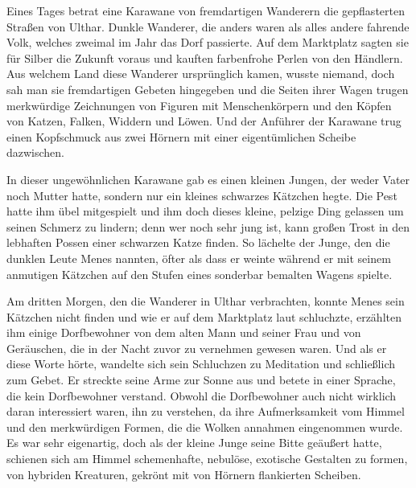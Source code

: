 \documentclass[a4paper]{memoir}
\begin{document}
Eines Tages betrat eine Karawane von fremdartigen Wanderern die gepflasterten Straßen von Ulthar. Dunkle Wanderer, die anders waren als alles andere fahrende Volk, welches zweimal im Jahr das Dorf passierte. Auf dem Marktplatz sagten sie für Silber die Zukunft voraus und kauften farbenfrohe Perlen von den Händlern. Aus welchem Land diese Wanderer ursprünglich kamen, wusste niemand, doch sah man sie fremdartigen Gebeten hingegeben und die Seiten ihrer Wagen trugen merkwürdige Zeichnungen von Figuren mit Menschenkörpern und den Köpfen von Katzen, Falken, Widdern und Löwen. Und der Anführer der Karawane trug einen Kopfschmuck aus zwei Hörnern mit einer eigentümlichen Scheibe dazwischen.

In dieser ungewöhnlichen Karawane gab es einen kleinen Jungen, der weder Vater noch Mutter hatte, sondern nur ein kleines schwarzes Kätzchen hegte. Die Pest hatte ihm übel mitgespielt und ihm doch dieses kleine, pelzige Ding gelassen um seinen Schmerz zu lindern; denn wer noch sehr jung ist,  kann großen Trost in den lebhaften Possen einer schwarzen Katze finden. So lächelte der Junge, den die dunklen Leute Menes nannten, öfter als dass er weinte während er mit seinem anmutigen Kätzchen auf den Stufen eines sonderbar bemalten Wagens spielte.

Am dritten Morgen, den die Wanderer in Ulthar verbrachten, konnte Menes sein Kätzchen nicht finden und wie er auf dem Marktplatz laut schluchzte, erzählten ihm einige Dorfbewohner von dem alten Mann und seiner Frau und von Geräuschen, die in der Nacht zuvor zu vernehmen gewesen waren. Und als er diese Worte hörte, wandelte sich sein Schluchzen zu Meditation und schließlich zum Gebet. Er streckte seine Arme zur Sonne aus und betete in einer Sprache, die kein Dorfbewohner verstand. Obwohl die Dorfbewohner auch nicht wirklich daran interessiert waren, ihn zu verstehen, da ihre Aufmerksamkeit vom Himmel und den merkwürdigen Formen, die die Wolken annahmen eingenommen wurde. Es war sehr eigenartig, doch als der kleine Junge seine Bitte geäußert hatte, schienen sich am Himmel schemenhafte, nebulöse, exotische Gestalten zu formen, von hybriden Kreaturen, gekrönt mit von Hörnern flankierten Scheiben.
\end{document}
